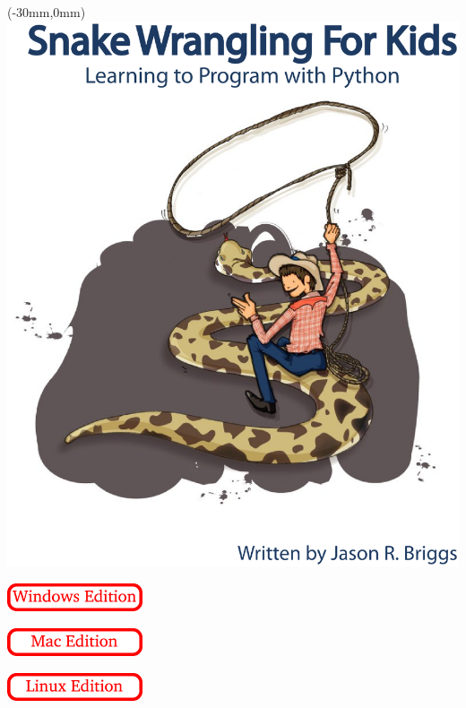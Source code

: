 \pagestyle{empty}
\frontmatter
\begin{titlepage}
\begin{textblock*}{210mm}(-30mm,0mm)
   \includegraphics[width=0.9\paperwidth]{../en/cover.eps}
\end{textblock*}
\begin{flushright}
\vspace{30mm}
\begin{WINDOWS}
	\includegraphics[width=40mm]{../en/windows-edition.eps} 
\end{WINDOWS}
\begin{MAC}
	\includegraphics[width=40mm]{../en/mac-edition.eps} 
\end{MAC}
\begin{LINUX}
	\includegraphics[width=40mm]{../en/linux-edition.eps} 
\end{LINUX}
\end{flushright}
\end{titlepage}
